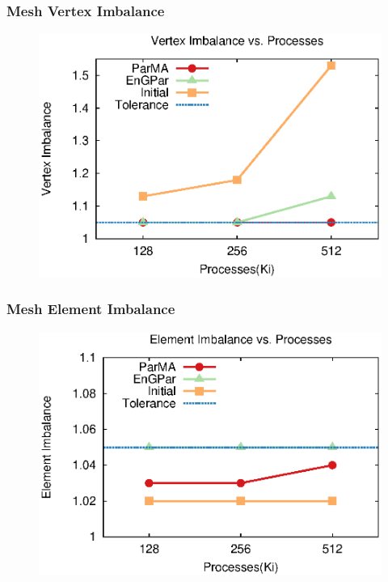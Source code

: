 \documentclass{beamer}
\begin{document}
\begin{frame}
  \frametitle{Mesh Vertex Imbalance}
  \begin{figure}
    \centering
    \includegraphics[width=.8\textwidth]{figures/vimb_v_cores.eps}
  \end{figure}  
\end{frame}

\begin{frame}
  \frametitle{Mesh Element Imbalance}
  \begin{figure}
    \centering
    \includegraphics[width=.8\textwidth]{figures/eimb_v_cores.eps}
  \end{figure}  
\end{frame}
\end{document}
